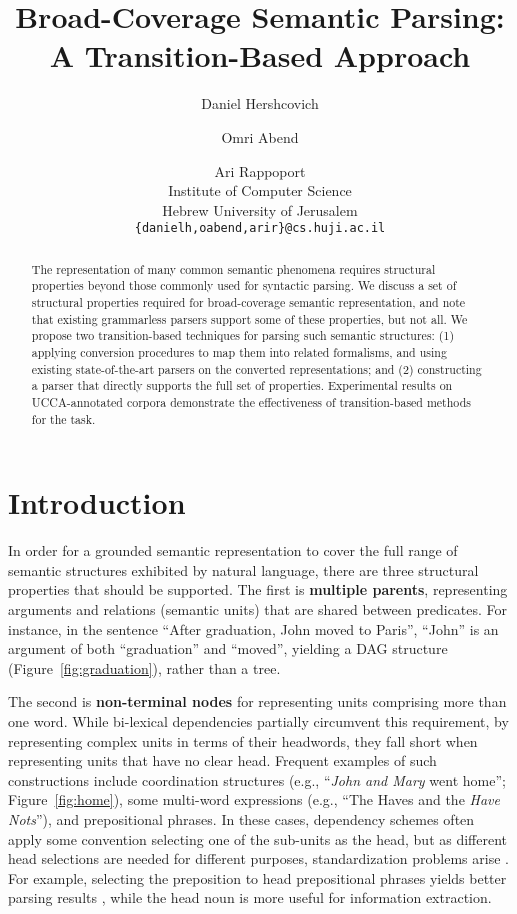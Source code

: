 \documentclass[11pt,letterpaper]{article}
\title{Broad-Coverage Semantic Parsing: A Transition-Based Approach}
\author{Daniel Hershcovich \and Omri Abend \and Ari Rappoport \\
  Institute of Computer Science \\
  Hebrew University of Jerusalem \\
  {\tt \{danielh,oabend,arir\}@cs.huji.ac.il}
}
\date{}
\newcommand{\figref}[1]{Figure~\ref{#1}}
\begin{document}
\maketitle

\begin{abstract}

  The representation of many common semantic phenomena requires 
  structural properties beyond those commonly used for syntactic parsing.
  We discuss a set of structural properties required for
  broad-coverage semantic representation, and note that existing grammarless
  parsers support some of these properties, but not all.
  We propose two transition-based techniques for parsing such semantic structures:
  (1) applying conversion procedures to map them into related formalisms,
  and using existing state-of-the-art parsers on the converted representations;
  and (2) constructing a parser that directly supports the full set of properties.
  Experimental results on UCCA-annotated corpora
  demonstrate the effectiveness of transition-based methods for the task.
  
\end{abstract}



\section{Introduction}

In order for a grounded semantic representation to cover the full range of semantic
structures exhibited by
natural language, there are three structural properties that should be supported.
The first is \textbf{multiple parents},
representing arguments and relations (semantic units) that are shared between predicates.
For instance, in the sentence
``After graduation, John moved to Paris'', ``John'' is an argument of both ``graduation''
and ``moved'', yielding a DAG structure (\figref{fig:graduation}), rather than a tree.

The second is \textbf{non-terminal nodes} for representing units
comprising more than one word.
While bi-lexical dependencies partially circumvent this requirement, by
representing complex units in terms of their headwords, they fall short
when representing units that have no clear head.
Frequent examples of such constructions include
coordination structures (e.g., ``\textit{John and Mary} went home''; \figref{fig:home}),
some multi-word expressions (e.g., ``The Haves and the \textit{Have Nots}''),
and prepositional phrases.
In these cases, dependency schemes often apply some convention selecting one of the sub-units
as the head, but as different head selections are needed for different purposes,
standardization problems arise \cite{Ivanova2012who}.
For example, selecting the preposition to head prepositional phrases yields better
parsing results \cite{Schwartz:12}, while the head noun is more useful for
information extraction.
\end{document}
